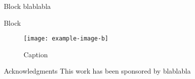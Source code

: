 \documentclass[final,hyperref={pdfpagelabels=false}]{beamer}
\begin{document}
\begin{frame}[t]
\begin{columns}[t]
\begin{column}{.465\textwidth}
\end{column} %

\begin{column}{.03\textwidth}\end{column} %
 
\begin{column}{.465\textwidth} %


\begin{block}{Block}
	blablabla
\end{block}


\begin{block}{Block}
\begin{figure}
\texttt{[image: example-image-b]}%
\vspace{-7mm}
\caption{Caption}
\label{fig:simu}
\end{figure}
\end{block}



\begin{block}{Acknowledgments}
\footnotesize%
\noindent This work has been sponsored by blablabla
\end{block}

%
%
%
%


\end{column}
\end{columns}
\end{frame}
\end{document}
